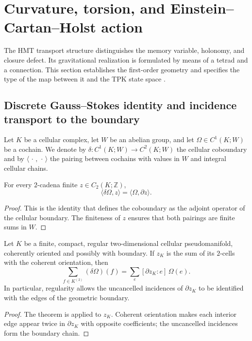 \section{Curvature, torsion, and Einstein--Cartan--Holst action}
\label{chap:gravedad-cartan-holst}

The HMT transport structure distinguishes the memory variable,
holonomy, and closure defect. Its gravitational realization is formulated
by means of a tetrad and a connection. This section establishes the first-order
geometry and specifies the type of the map between it and the TPK state space
\@.

\subsection{Discrete Gauss–Stokes identity and incidence transport to the boundary}

Let \(K\) be a cellular complex, let \(W\) be an abelian
group, and let \(\Omega\in C^1(K;W)\) be a cochain. We denote by
\(\delta:C^1(K;W)\to C^2(K;W)\) the cellular coboundary and by \(\langle\,\cdot\,,\,\cdot\,\rangle\) the pairing
between cochains with values in \(W\) and integral cellular chains.

\begin{theorem}
For every \(2\)-cadena finite \(z\in C_2(K;\mathbb Z)\),
\[
 \boxed{\langle\delta\Omega,z\rangle
 =\langle\Omega,\partial z\rangle.}
\]
\end{theorem}
\begin{proof}
This is the identity that defines the coboundary as the adjoint operator of the cellular
boundary. The finiteness of \(z\) ensures that both pairings are finite
sums in \(W\).
\end{proof}

\begin{corollary}
Let \(K\) be a finite, compact, regular two-dimensional cellular pseudomanifold,
coherently oriented and possibly with boundary. If \(z_K\) is the sum of
its \(2\)-cells with the coherent orientation, then
\[
 \sum_{f\in K^{(2)}}(\delta\Omega)(f)
 =\sum_e[\partial z_K:e]\,\Omega(e).
\]
In particular, regularity allows the uncancelled incidences of
\(\partial z_K\) to be identified with the edges of the geometric boundary.
\end{corollary}
\begin{proof}
The theorem is applied to \(z_K\). Coherent orientation makes each
interior edge appear twice in \(\partial z_K\) with opposite coefficients;
the uncancelled incidences form the boundary chain.
\end{proof}

